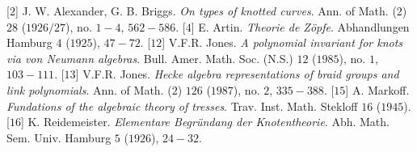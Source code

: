 \begin{multicols}{2}
{	\vskip 0.1cm
	[$2$] J. W. Alexander, G. B. Briggs. \textit{On types of knotted curves}. Ann. of Math. ($2$) $28$ ($1926/27$), no. $1-4$, $562-586$.
	\vskip 0.1cm
	[$4$] E. Artin. \textit{Theorie de Zöpfe}. Abhandlungen Hamburg $4$ ($1925$), $47-72$.
	\vskip 0.1cm
	[$12$] V.F.R. Jones. \textit{A polynomial invariant for knots via von Neumann algebras}. Bull. Amer. Math. Soc. (N.S.) $12$ ($1985$), no. $1$, $103-111$.
	\vskip 0.1cm
	[$13$] V.F.R. Jones. \textit{Hecke algebra representations of braid groups and link polynomials}. Ann. of Math. ($2$) $126$ ($1987$), no. $2$, $335-388$.
	\vskip 0.1cm
	[$15$] A. Markoff. \textit{Fundations of the algebraic theory of tresses}. Trav. Inst. Math. Stekloff $16$ ($1945$).
	\vskip 0.1cm
	[$16$] K. Reidemeister. \textit{Elementare Begründang der Knotentheorie}. Abh. Math. Sem. Univ. Hamburg $5$ ($1926$), $24-32$.}
\end{multicols}